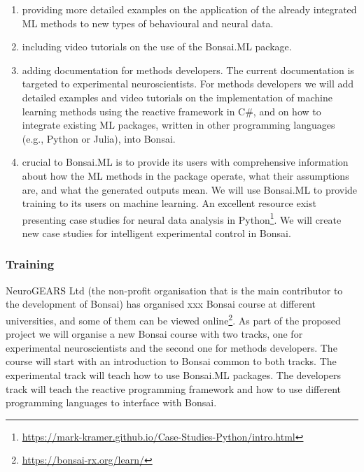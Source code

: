 \begin{enumerate}

    \item providing more detailed examples on the application of the
        already integrated ML methods to new types of behavioural and
        neural data.

    \item including video tutorials on the use of the Bonsai.ML
        package.

    \item adding documentation for methods developers. The current
        documentation is targeted to experimental neuroscientists. For methods
        developers we will add detailed examples and video tutorials on the
        implementation of machine learning methods using the reactive framework
        in C\#, and on how to integrate existing ML packages, written in
        other programming languages (e.g., Python or Julia), into Bonsai.

    \item crucial to Bonsai.ML is to provide its users with comprehensive
        information about how the ML methods in the package operate, what their
        assumptions are, and what the generated outputs mean. We will use
        Bonsai.ML to provide training to its users on machine learning.  An
        excellent resource exist presenting case studies for neural data
        analysis in
        Python\footnote[9]{\url{https://mark-kramer.github.io/Case-Studies-Python/intro.html}}.
        We will create new case studies for intelligent experimental control in
        Bonsai.

\end{enumerate}

\subsubsection*{Training}

NeuroGEARS Ltd (the non-profit organisation that is the main contributor to the
development of Bonsai) has organised xxx Bonsai course at different
universities, and some of them can be viewed
online\footnote[10]{\url{https://bonsai-rx.org/learn/}}. As part of the
proposed project we will organise a new Bonsai course with two tracks, one for
experimental neuroscientists and the second one for methods developers. The
course will start with an introduction to Bonsai common to both tracks. The
experimental track will teach how to use Bonsai.ML packages. The developers
track will teach the reactive programming framework and how to use different
programming languages to interface with Bonsai.

